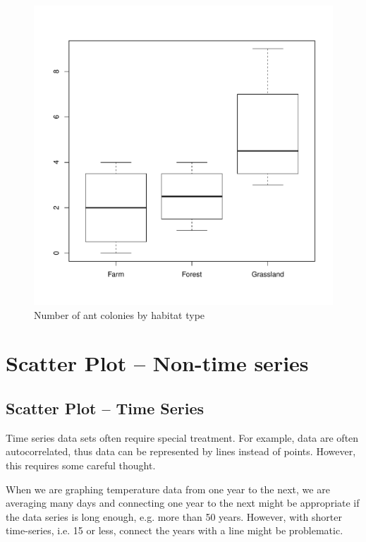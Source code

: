 \documentclass{article}\usepackage[]{graphicx}\usepackage[]{color}
\makeatletter
\def\maxwidth{ %
  \ifdim\Gin@nat@width>\linewidth
    \linewidth
  \else
    \Gin@nat@width
  \fi
}
\newenvironment{knitrout}{}{} %
\makeatother
\begin{document}
\begin{knitrout}
\color{fgcolor}\begin{figure}
\includegraphics[width=\maxwidth]{figure/unnamed-chunk-6-1} \caption[Number of ant colonies by habitat type]{Number of ant colonies by habitat type}\label{fig:unnamed-chunk-6}
\end{figure}


\end{knitrout}
\newpage
\section{Scatter Plot -- Non-time series}



\subsection{Scatter Plot -- Time Series}

Time series data sets often require special treatment. For example, data are often autocorrelated, thus data can be represented by lines instead of points. However, this requires some careful thought. 

When we are graphing temperature data from one year to the next, we are averaging many days and connecting one year to the next might be appropriate if the data series is long enough, e.g. more than 50 years. However, with shorter time-series, i.e. 15 or less, connect the years with a line might be problematic.
\end{document}
